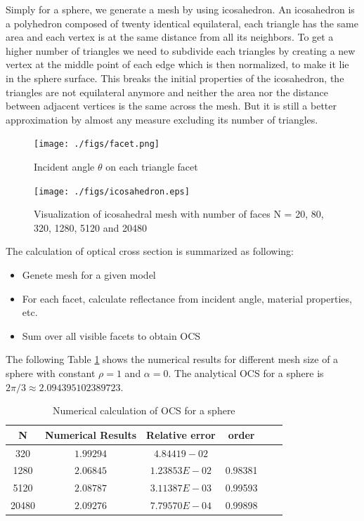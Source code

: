 \documentclass[11pt]{amsart}
\theoremstyle{definition}
\begin{document}
Simply for a sphere, we generate a mesh by using icosahedron. An icosahedron is a polyhedron composed of twenty identical equilateral, each triangle has the same area and each vertex is at the same distance from all its neighbors. To get a higher number of triangles we need to subdivide each triangles by creating a new vertex at the middle point of each edge which is then normalized, to make it lie in the sphere surface. This breaks the initial properties of the icosahedron, the triangles are not equilateral anymore and neither the area nor the distance between adjacent vertices is the same across the mesh. But it is still a better approximation by almost any measure excluding its number of triangles. 

\begin{figure}[H]  	\centerline{\texttt{[image: ./figs/facet.png]}}
		\caption{Incident angle $\theta$ on each triangle facet}
        \label{fig:facet}
\end{figure}

\begin{figure}[H] 	\centerline{\texttt{[image: ./figs/icosahedron.eps]}}
		\caption{Visualization of icosahedral mesh with number of faces N = 20, 80, 320, 1280, 5120 and 20480}
        \label{fig:icosahedron}
\end{figure}

The calculation of optical cross section is summarized as following:
\begin{itemize}
\item Genete mesh for a given model
\item For each facet, calculate reflectance from incident angle, material properties, etc.
\item Sum over all visible facets to obtain OCS
\end{itemize} 
The following Table \ref{table: sphere OCS} shows the numerical results for different mesh size of a sphere with constant $\rho=1$ and $\alpha=0$. The analytical OCS for a sphere is $2\pi/3\approx 2.094395102389723$.
\begin{table}[H]
	\small
	\caption{Numerical calculation of OCS for a sphere
	}
	\centering
	\begin{tabular}{|c|c|c|c|c|c|}
	\hline
	N & Numerical Results & Relative error & order \\
	\hline
	320 & $1.99294$ & $4.84419-02$ &  \\
    \hline	
	1280 & $2.06845$ & $1.23853E-02$ & 0.98381 \\
    \hline	
	5120 & $2.08787$ & $3.11387E-03$ & 0.99593 \\
	\hline
	20480 & $2.09276$ & $7.79570E-04$ & 0.99898 \\
	\hline
	\end{tabular}
	\label{table: sphere OCS}
\end{table}
  
\end{document}
